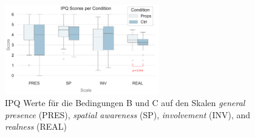 \begin{figure}[htb]
   \begin{center}
   	   \includegraphics[width=0.6\textwidth]{include/images/ipq_per_condition}
   	\captionsetup{subrefformat=parens}
   	\caption{\gls{IPQ} Werte für die Bedingungen B und C auf den Skalen \textit{general presence} (PRES), \textit{spatial awareness} (SP), \textit{involvement} (INV), and \textcolor{secondary}{\textit{realness} (REAL)}}
   	\label{fig:presence}
   \end{center}
\end{figure}